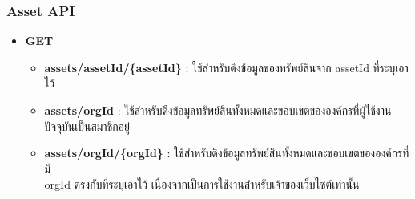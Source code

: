 \subsubsection{Asset API}

\ifenglish
\else
\begin{itemize}
    \item \textbf{GET}
    \begin{itemize}
        \item \textbf{assets/assetId/\{assetId\}} : ใช้สำหรับดึงข้อมูลของทรัพย์สินจาก assetId ที่ระบุเอาไว้
        \item \textbf{assets/orgId} : ใช้สำหรับดึงข้อมูลทรัพย์สินทั้งหมดและขอบเขตขององค์กรที่ผู้ใช้งานปัจจุบันเป็นสมาชิกอยู่
        \item \textbf{assets/orgId/\{orgId\}} : ใช้สำหรับดึงข้อมูลทรัพย์สินทั้งหมดและขอบเขตขององค์กรที่มี \\orgId ตรงกับที่ระบุเอาไว้ เนื่องจากเป็นการใช้งานสำหรับเจ้าของเว็บไซต์เท่านั้น
    \end{itemize}
\end{itemize}
\fi